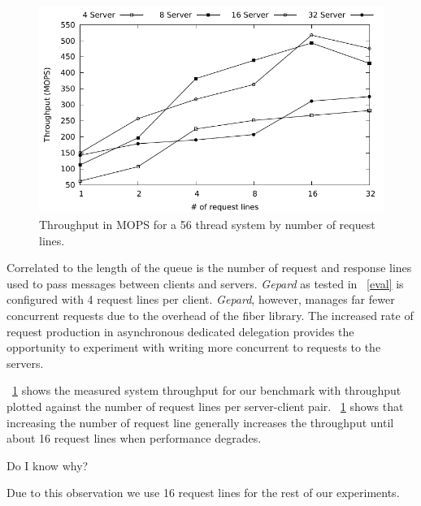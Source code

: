 \documentclass{uicthesi}
\begin{document}
\begin{figure}[ht!]
\centering
\includegraphics[width=0.9\columnwidth]{FIG/thput_by_rl.pdf}
\caption{Throughput in MOPS for a 56 thread system by number of request lines. }
\label{fig:dedicated_thput_by_rl}
\end{figure}

Correlated to the length of the queue is the number of request and response lines used to pass messages between clients and servers. \textit{Gepard} as tested in ~\autoref{eval} is configured with 4 request lines per client. \textit{Gepard}, however, manages far fewer concurrent requests due to the overhead of the fiber library. The increased rate of  request production in asynchronous dedicated delegation provides the opportunity to experiment with writing more concurrent to requests to the servers. 

~\ref{fig:dedicated_thput_by_rl} shows the measured system throughput for our benchmark with throughput plotted against the number of request lines per server-client pair. ~\ref{fig:dedicated_thput_by_rl} shows that increasing the number of request line generally increases the throughput until about 16 request lines when performance degrades. 

Do I know why?

Due to this observation we use 16 request lines for the rest of our experiments. 
\end{document}
